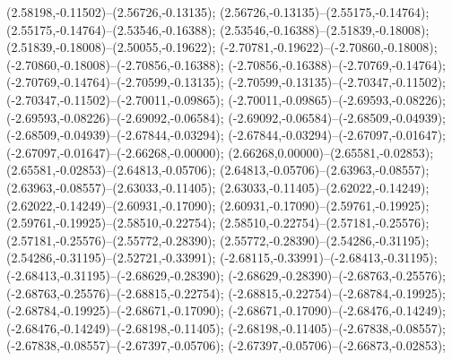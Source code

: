  (2.58198,-0.11502)--(2.56726,-0.13135);
 (2.56726,-0.13135)--(2.55175,-0.14764);
 (2.55175,-0.14764)--(2.53546,-0.16388);
 (2.53546,-0.16388)--(2.51839,-0.18008);
 (2.51839,-0.18008)--(2.50055,-0.19622);
 (-2.70781,-0.19622)--(-2.70860,-0.18008);
 (-2.70860,-0.18008)--(-2.70856,-0.16388);
 (-2.70856,-0.16388)--(-2.70769,-0.14764);
 (-2.70769,-0.14764)--(-2.70599,-0.13135);
 (-2.70599,-0.13135)--(-2.70347,-0.11502);
 (-2.70347,-0.11502)--(-2.70011,-0.09865);
 (-2.70011,-0.09865)--(-2.69593,-0.08226);
 (-2.69593,-0.08226)--(-2.69092,-0.06584);
 (-2.69092,-0.06584)--(-2.68509,-0.04939);
 (-2.68509,-0.04939)--(-2.67844,-0.03294);
 (-2.67844,-0.03294)--(-2.67097,-0.01647);
 (-2.67097,-0.01647)--(-2.66268,-0.00000);
 (2.66268,0.00000)--(2.65581,-0.02853);
 (2.65581,-0.02853)--(2.64813,-0.05706);
 (2.64813,-0.05706)--(2.63963,-0.08557);
 (2.63963,-0.08557)--(2.63033,-0.11405);
 (2.63033,-0.11405)--(2.62022,-0.14249);
 (2.62022,-0.14249)--(2.60931,-0.17090);
 (2.60931,-0.17090)--(2.59761,-0.19925);
 (2.59761,-0.19925)--(2.58510,-0.22754);
 (2.58510,-0.22754)--(2.57181,-0.25576);
 (2.57181,-0.25576)--(2.55772,-0.28390);
 (2.55772,-0.28390)--(2.54286,-0.31195);
 (2.54286,-0.31195)--(2.52721,-0.33991);
 (-2.68115,-0.33991)--(-2.68413,-0.31195);
 (-2.68413,-0.31195)--(-2.68629,-0.28390);
 (-2.68629,-0.28390)--(-2.68763,-0.25576);
 (-2.68763,-0.25576)--(-2.68815,-0.22754);
 (-2.68815,-0.22754)--(-2.68784,-0.19925);
 (-2.68784,-0.19925)--(-2.68671,-0.17090);
 (-2.68671,-0.17090)--(-2.68476,-0.14249);
 (-2.68476,-0.14249)--(-2.68198,-0.11405);
 (-2.68198,-0.11405)--(-2.67838,-0.08557);
 (-2.67838,-0.08557)--(-2.67397,-0.05706);
 (-2.67397,-0.05706)--(-2.66873,-0.02853);
